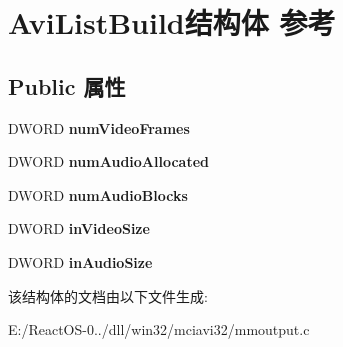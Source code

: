 \hypertarget{struct_avi_list_build}{}\section{Avi\+List\+Build结构体 参考}
\label{struct_avi_list_build}
\subsection*{Public 属性}
\begin{DoxyCompactItemize}
\item 
\mbox{\label{struct_avi_list_build_af718d737cfcf871afa4d6155d0182b98}} 
D\+W\+O\+RD {\bfseries num\+Video\+Frames}
\item 
\mbox{\label{struct_avi_list_build_a870a0233a35043e4a8e2dda2caa38a38}} 
D\+W\+O\+RD {\bfseries num\+Audio\+Allocated}
\item 
\mbox{\label{struct_avi_list_build_a160f6d24a4ab05405f905142eaed90f0}} 
D\+W\+O\+RD {\bfseries num\+Audio\+Blocks}
\item 
\mbox{\label{struct_avi_list_build_a3628af82bcfe36ae2b2c35046d9c3b0c}} 
D\+W\+O\+RD {\bfseries in\+Video\+Size}
\item 
\mbox{\label{struct_avi_list_build_a6da2b4aa789d61a7c1d584a204892045}} 
D\+W\+O\+RD {\bfseries in\+Audio\+Size}
\end{DoxyCompactItemize}


该结构体的文档由以下文件生成\+:\begin{DoxyCompactItemize}
\item 
E\+:/\+React\+O\+S-\/0../dll/win32/mciavi32/mmoutput.\+c\end{DoxyCompactItemize}
